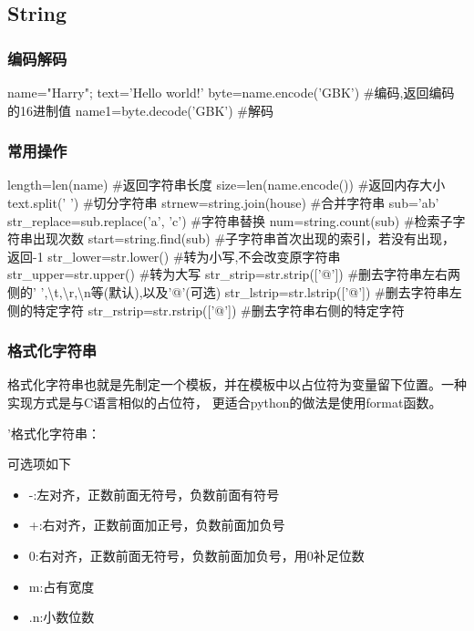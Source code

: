 \documentclass{article}
\begin{document}
    \subsection{String}
      \subsubsection{编码解码}
        \begin{codeblock}[language=python, caption={create a string}]
          name="Harry"; text='Hello world!'
          byte=name.encode('GBK') #编码,返回编码的16进制值
          name1=byte.decode('GBK') #解码
        \end{codeblock}

      \subsubsection{常用操作}
        \begin{codeblock}[language=python, caption={basic operations of string}]
          length=len(name) #返回字符串长度
          size=len(name.encode()) #返回内存大小
          text.split(' ') #切分字符串
          strnew=string.join(house) #合并字符串
          sub='ab'
          str_replace=sub.replace('a', 'c') #字符串替换
          num=string.count(sub) #检索子字符串出现次数
          start=string.find(sub) #子字符串首次出现的索引，若没有出现，返回-1
          str_lower=str.lower() #转为小写,不会改变原字符串
          str_upper=str.upper() #转为大写
          str_strip=str.strip(['@']) #删去字符串左右两侧的' ',\textbackslash t,\textbackslash r,\textbackslash n等(默认),以及'@'(可选)
          str_lstrip=str.lstrip(['@']) #删去字符串左侧的特定字符
          str_rstrip=str.rstrip(['@']) #删去字符串右侧的特定字符
        \end{codeblock}

      \subsubsection{格式化字符串}
        格式化字符串也就是先制定一个模板，并在模板中以占位符为变量留下位置。一种实现方式是与C语言相似的占位符，
        更适合python的做法是使用format函数。
        \begin{codeblock}[language=python, caption={formatting string1}]
          '格式化字符串：%
        \end{codeblock}

        可选项如下
        \begin{itemize}
          \item -:左对齐，正数前面无符号，负数前面有符号
          \item +:右对齐，正数前面加正号，负数前面加负号
          \item 0:右对齐，正数前面无符号，负数前面加负号，用0补足位数
          \item m:占有宽度
          \item .n:小数位数
        \end{itemize}
\end{document}
